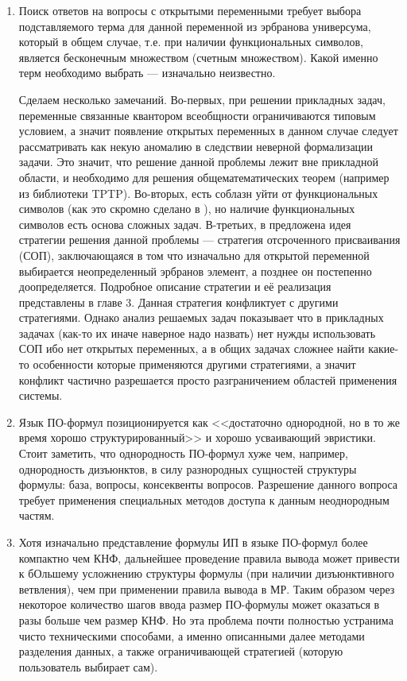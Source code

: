 \begin{enumerate}

\item Поиск ответов на вопросы с открытыми переменными требует выбора
  подставляемого терма для данной переменной из эрбранова универсума,
  который в общем случае, т.е. при наличии функциональных символов, является бесконечным множеством (счетным множеством). Какой именно терм необходимо выбрать --- изначально неизвестно.

Сделаем несколько замечаний. Во-первых, при решении прикладных задач, переменные связанные квантором всеобщности ограничиваются типовым условием, а значит появление открытых переменных в данном случае следует рассматривать как некую аномалию в следствии неверной формализации задачи. Это значит, что решение данной проблемы лежит вне прикладной области, и необходимо для решения общематематических теорем (например из библиотеки TPTP).  Во-вторых, есть соблазн уйти от функциональных символов (как это скромно сделано в \cite{Vas_ICDS}), но наличие функциональных символов есть основа сложных задач. В-третьих, в \cite{Vas_ICDS} предложена идея стратегии решения данной проблемы --- стратегия отсроченного присваивания (СОП), заключающаяся в том что изначально для открытой переменной выбирается неопределенный эрбранов элемент, а позднее он постепенно доопределяется. Подробное описание стратегии и её реализация представлены в главе 3. Данная стратегия конфликтует с другими стратегиями. Однако анализ решаемых задач показывает что в прикладных задачах (как-то их иначе наверное надо назвать) нет нужды использовать СОП ибо нет открытых переменных, а в общих задачах сложнее найти какие-то особенности которые применяются другими стратегиями, а значит конфликт частично разрешается просто разграничением областей применения системы.

\item Язык ПО-формул позиционируется как <<достаточно однородной, но в то же время хорошо структурированный>> и хорошо усваивающий эвристики. Стоит заметить, что однородность ПО-формул хуже чем, например, однородность дизъюнктов, в силу разнородных сущностей структуры формулы: база, вопросы, консеквенты вопросов. Разрешение данного вопроса требует применения специальных методов доступа к данным неоднородным частям.

\item Хотя изначально представление формулы ИП в языке ПО-формул более компактно чем КНФ, дальнейшее проведение правила вывода может привести к бОльшему усложнению структуры формулы (при наличии дизъюнктивного ветвления), чем при применении правила вывода в МР. Таким образом через некоторое количество шагов ввода размер ПО-формулы может оказаться в разы больше чем размер КНФ. Но эта проблема почти полностью устранима чисто техническими способами, а именно описанными далее методами разделения данных, а также ограничивающей стратегией (которую пользователь выбирает сам).

\end{enumerate}


